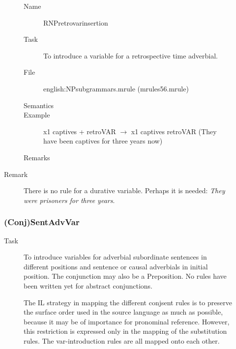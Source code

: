\begin{description}
\begin{description}
\vspace{1 cm}
\begin{description}
\item[Name] RNPretrovarinsertion
\item[Task] To introduce a variable for a retrospective time adverbial. 
\item[File] english:NPsubgrammars.mrule (mrules56.mrule)
\item[Semantics]
\item[Example] x1 captives + retroVAR $\rightarrow$ x1 captives retroVAR 
(They have been captives for three years now)
\item[Remarks]
\end{description}

\item[Remark] There is no rule for a durative variable. Perhaps it is 
needed: {\em They were prisoners for three years\/}.

\end{description}

\subsubsection{(Conj)SentAdvVar}
\begin{description}
\item[Task] To introduce variables for adverbial subordinate sentences in 
different positions and sentence or causal adverbials in initial position. The 
conjunction may also be a Preposition. No rules have been written yet for 
abstract conjunctions.

The IL strategy in mapping the different 
conjsent rules is to preserve the surface order used in the source language as 
much as possible, because it may be of importance for pronominal reference. 
However, this restriction is expressed only in the mapping of the substitution 
rules. The var-introduction rules are all mapped onto each other.


\end{description}
\end{description}
